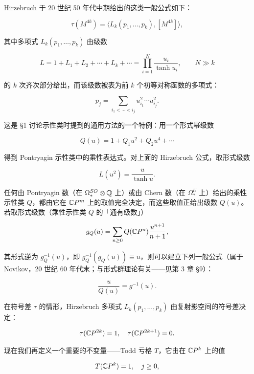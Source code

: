 Hirzebruch 于 20 世纪 50 年代中期给出的这类一般公式如下：

\begin{equation}
\tau(M^{4k})=\langle L_k(p_1,\dots,p_k),[M^{4k}]\rangle, \tag{3.19}
\end{equation}

其中多项式 $L_k(p_1,\dots,p_k)$ 由级数

\[ L=1+L_1+L_2+\cdots+L_k+\cdots=\prod_{i=1}^{N}\frac{u_i}{\tanh u_i},\qquad N\gg k \]

的 $k$ 次齐次部分给出，而该级数被表为前 $k$ 个初等对称函数的多项式：

\[ p_j=\sum_{i_1<\cdots<i_j}u_{i_1}^2\cdots u_{i_j}^2. \]

这是 §1 讨论示性类时提到的通用方法的一个特例：用一个形式幂级数

\[ Q(u)=1+Q_1u^2+Q_2u^4+\cdots \]

得到 Pontryagin 示性类中的乘性表达式。对上面的 Hirzebruch 公式，取形式级数

\begin{equation}
L(u^2)=\frac{u}{\tanh u}. \tag{3.20}
\end{equation}

任何由 Pontryagin 数（在 $\Omega_*^{SO}\otimes\mathbb{Q}$ 上）或由 Chern 数（在 $\Omega_*^{U}$ 上）给出的乘性示性类 $Q$，都由它在 $\mathbb{C}P^m$ 上的取值完全决定，而这些取值正给出级数 $Q(u)$。若取形式级数（乘性示性类 $Q$ 的「通有级数」）

\[ g_Q(u)=\sum_{n\ge 0}Q(\mathbb{C}P^n)\frac{u^{n+1}}{n+1}, \]

其形式逆为 $g_Q^{-1}(u)$，即 $g_Q^{-1}(g_Q(u))\equiv u$，则可以建立下列一般公式（属于 Novikov，20 世纪 60 年代末；与形式群理论有关——见第 3 章 §9）：

\begin{equation}
\frac{u}{Q(u)}=g^{-1}(u). \tag{3.21}
\end{equation}


在符号差 $\tau$ 的情形，Hirzebruch 多项式 $L_k(p_1,\dots,p_k)$ 由复射影空间的符号差决定：

\[ \tau(\mathbb{C}P^{2k})=1,\quad \tau(\mathbb{C}P^{2k+1})=0. \]

现在我们再定义一个重要的不变量——Todd 亏格 $T$，它由在 $\mathbb{C}P^k$ 上的值

\[ T(\mathbb{C}P^k)=1,\quad j\ge 0, \]

